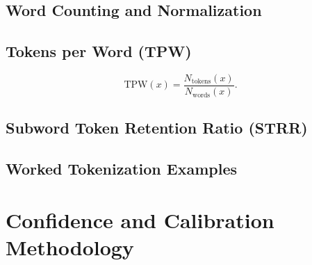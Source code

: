 \documentclass[runningheads]{llncs}
\begin{document}
\subsection{Word Counting and Normalization}

\subsection{Tokens per Word (TPW)}
\begin{equation}
	\mathrm{TPW}(x) =
	\frac{N_{\mathrm{tokens}}(x)}
	{N_{\mathrm{words}}(x)}.
	\label{eq:tpw}
\end{equation}

\subsection{Subword Token Retention Ratio (STRR)}

\subsection{Worked Tokenization Examples}


\section{Confidence and Calibration Methodology}
\end{document}
